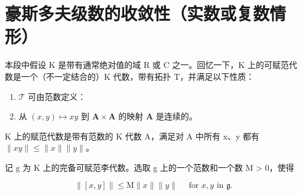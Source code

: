 \section{豪斯多夫级数的收敛性（实数或复数情形）}

本段中假设 K 是带有通常绝对值的域 R 或 C 之一。回忆一下，K 上的可赋范代数是一个（不一定结合的）K 代数，带有拓扑 T，并满足以下性质：

\begin{enumerate}
\def\labelenumi{(\arabic{enumi})}
\item
  \(\mathcal{T}\) 可由范数定义：
\item
  从 \((x,y)\mapsto xy\) 到 \(\mathbf{A}\times \mathbf{A}\) 的映射 \(\mathbf{A}\) 是连续的。
\end{enumerate}

K 上的赋范代数是带有范数的 K 代数 A，满足对 A 中所有 x、y 都有 \(\|xy\|\leqslant\|x\|\|y\|\)。

记 g 为 K 上的完备可赋范李代数。选取 g 上的一个范数和一个数 M > 0，使得

\[
\| [ x, y ] \| \leqslant \mathrm{M} \| x \| \| y \| \quad \text { for } x, y \text { in } \mathfrak {g}.\tag{1}
\]

